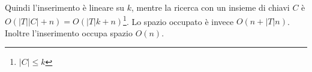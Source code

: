 \documentclass[a4paper]{article}
\begin{document}
Quindi l'inserimento è lineare su $k$, mentre la ricerca con un insieme di chiavi $C$ è $O(|T||C| + n) = O(|T|k + n)$\footnote{$|C| \leq k$}. Lo spazio occupato è invece $O(n + |T|n)$. Inoltre l'inserimento occupa spazio $O(n)$.





\end{document}
